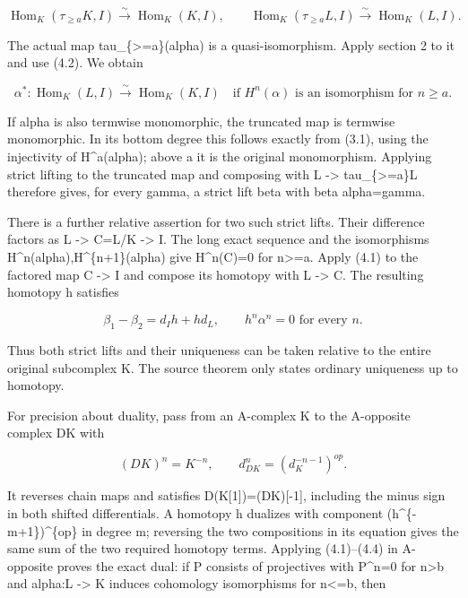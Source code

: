\[
 \operatorname{Hom}_K(\tau_{\ge a}K,I)
       \xrightarrow{\sim}\operatorname{Hom}_K(K,I),
 \qquad
 \operatorname{Hom}_K(\tau_{\ge a}L,I)
       \xrightarrow{\sim}\operatorname{Hom}_K(L,I).        \tag{4.2}
\]

The actual map tau\_\allowbreak{}\{>\allowbreak{}=a\}(alpha)\allowbreak{} is a quasi-isomorphism. Apply section 2 to it and use (4.2)\allowbreak{}. We obtain

\[
 \alpha^*:\operatorname{Hom}_K(L,I)
             \xrightarrow{\sim}\operatorname{Hom}_K(K,I)
 \quad\text{if }H^n(\alpha)\text{ is an isomorphism for }n\ge a.
                                                               \tag{4.3}
\]

If alpha is also termwise monomorphic,\allowbreak{} the truncated map is termwise monomorphic. In its bottom degree this follows exactly from (3.1)\allowbreak{},\allowbreak{} using the injectivity of H\textasciicircum{}a(alpha)\allowbreak{}; above a it is the original monomorphism. Applying strict lifting to the truncated map and composing with L \allowbreak{}-> tau\_\allowbreak{}\{>\allowbreak{}=a\}L therefore gives,\allowbreak{} for every gamma,\allowbreak{} a strict lift beta with beta alpha\allowbreak{}=gamma.

There is a further relative assertion for two such strict lifts. Their difference factors as L \allowbreak{}-> C\allowbreak{}=L/\allowbreak{}K \allowbreak{}-> I. The long exact sequence and the isomorphisms H\textasciicircum{}n(alpha)\allowbreak{},\allowbreak{}H\textasciicircum{}\{n\allowbreak{}+1\}(alpha)\allowbreak{} give H\textasciicircum{}n(C)\allowbreak{}\allowbreak{}=0 for n>\allowbreak{}=a. Apply (4.1)\allowbreak{} to the factored map C \allowbreak{}-> I and compose its homotopy with L \allowbreak{}-> C. The resulting homotopy h satisfies

\[
 \beta_1-\beta_2=d_Ih+h d_L,\qquad h^n\alpha^n=0
                                                    \text{ for every }n. \tag{4.4}
\]

Thus both strict lifts and their uniqueness can be taken relative to the entire original subcomplex K. The source theorem only states ordinary uniqueness up to homotopy.

For precision about duality,\allowbreak{} pass from an A-complex K to the A-opposite complex DK with

\[
 (DK)^n=K^{-n},\qquad d_{DK}^n=(d_K^{-n-1})^{op}.
\]

It reverses chain maps and satisfies D(K[1]\allowbreak{})\allowbreak{}\allowbreak{}=(DK)\allowbreak{}[-1]\allowbreak{},\allowbreak{} including the minus sign in both shifted differentials. A homotopy h dualizes with component (h\textasciicircum{}\{-m\allowbreak{}+1\})\allowbreak{}\textasciicircum{}\{op\} in degree m; reversing the two compositions in its equation gives the same sum of the two required homotopy terms. Applying (4.1)\allowbreak{}–\allowbreak{}(4.4)\allowbreak{} in A-opposite proves the exact dual:\allowbreak{} if P consists of projectives with P\textasciicircum{}n\allowbreak{}=0 for n\textgreater b and alpha:\allowbreak{}L \allowbreak{}-> K induces cohomology isomorphisms for n<\allowbreak{}=b,\allowbreak{} then

